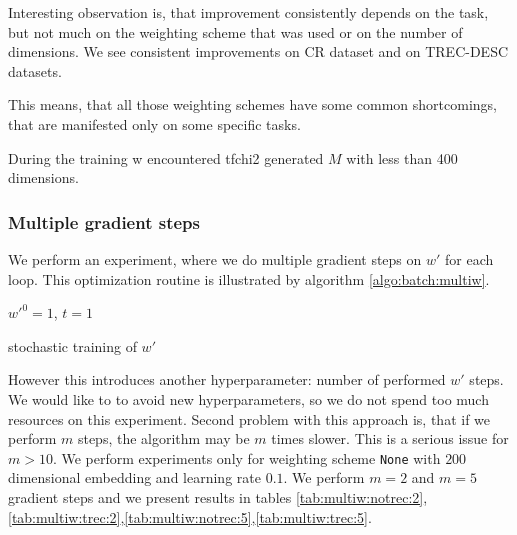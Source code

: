     Interesting observation is, that improvement consistently depends on the task, 
    but not much on the weighting scheme that was used or on the number of dimensions.
    We see consistent improvements on CR dataset and on TREC-DESC datasets.

    This means, that all those weighting schemes have some common shortcomings, 
    that are manifested only on some specific tasks.  \* %
    
    During the training w encountered 
    tfchi2 generated $M$ with less than 400 dimensions. 
    
    \subsubsection{Multiple gradient steps}
    
    We perform an experiment, where we do multiple gradient steps on $w'$ for each loop. 
    This optimization routine is illustrated by algorithm \ref{algo:batch:multiw}.
    
    \begin{algorithm}[H]
        $w'^0 = 1$, $t=1$\;
        \caption{stochastic training of $w'$} \label{algo:batch:multiw}
    \end{algorithm}
    
    However this introduces another hyperparameter: number of performed $w'$ steps.
    We would like to to avoid new hyperparameters, so we do not spend too much resources on this experiment.
    Second problem with this approach is, that if we perform $m$ steps, the algorithm may be $m$ times slower. 
    This is a serious issue for $m>10$. 
    We perform experiments only for weighting scheme \texttt{None} with $200$ dimensional embedding and learning rate $0.1$.
    We perform $m=2$ and $m=5$ gradient steps and we present results in tables \ref{tab:multiw:notrec:2},
    \ref{tab:multiw:trec:2},\ref{tab:multiw:notrec:5},\ref{tab:multiw:trec:5}.
    
    

